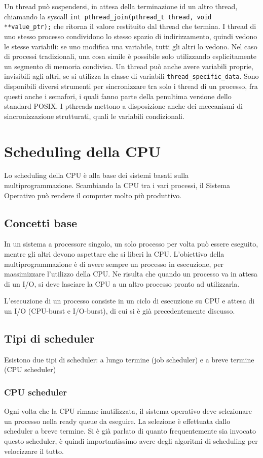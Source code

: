 \documentclass[a4paper]{article}
\begin{document}
Un thread può sospendersi, in attesa della terminazione id un altro thread, chiamando la syscall \texttt{int pthread\_join(pthread\_t thread, void **value\_ptr);} che ritorna il valore restituito dal thread che termina.
I thread di uno stesso processo condividono lo stesso spazio di indirizzamento, quindi vedono le stesse variabili: se uno modifica una variabile, tutti gli altri lo vedono. Nel caso di processi tradizionali, una cosa simile è possibile solo utilizzando esplicitamente un segmento di memoria condivisa. Un thread può anche avere variabili proprie, invisibili agli altri, se si utilizza la classe di variabili \texttt{thread\_specific\_data}. \newline
Sono disponibili diversi strumenti per sincronizzare tra solo i thread di un processo, fra questi anche i semafori, i quali fanno parte della penultima versione dello standard POSIX. I pthreads mettono a disposizione anche dei meccanismi di sincronizzazione strutturati, quali le variabili condizionali.

\newpage
\section{Scheduling della CPU}
Lo scheduling della CPU è alla base dei sistemi basati sulla multiprogrammazione. Scambiando la CPU tra i vari processi, il Sistema Operativo può rendere il computer molto più produttivo.
\subsection{Concetti base}
In un sistema a processore singolo, un solo processo per volta può essere eseguito, mentre gli altri devono aspettare che si liberi la CPU. L'obiettivo della multiprogrammazione è di avere sempre un processo in esecuzione, per massimizzare l'utilizzo della CPU. Ne risulta che quando un processo va in attesa di un I/O, si deve lasciare la CPU a un altro processo pronto ad utilizzarla.

L'esecuzione di un processo consiste in un ciclo di esecuzione su CPU e attesa di un I/O (CPU-burst e I/O-burst), di cui si è già precedentemente discusso.

\subsection{Tipi di scheduler}
Esistono due tipi di scheduler: a lungo termine (job scheduler) e a breve termine (CPU scheduler)

\subsubsection{CPU scheduler}
Ogni volta che la CPU rimane inutilizzata, il sistema operativo deve selezionare un processo nella ready queue da eseguire. La selezione è effettuata dallo scheduler a breve termine. Si è già parlato di quanto frequentemente sia invocato questo scheduler, è quindi importantissimo avere degli algoritmi di scheduling per velocizzare il tutto.
\end{document}
